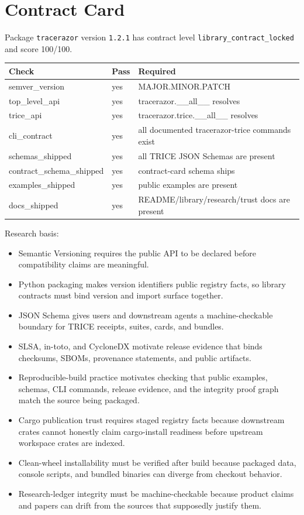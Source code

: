\section{Contract Card}
Package \texttt{tracerazor} version \texttt{1.2.1} has contract level \texttt{library\_contract\_locked} and score 100/100.

\begin{tabular}{lll}
Check & Pass & Required \\
\hline
semver\_version & yes & MAJOR.MINOR.PATCH \\
top\_level\_api & yes & tracerazor.\_\_all\_\_ resolves \\
trice\_api & yes & tracerazor.trice.\_\_all\_\_ resolves \\
cli\_contract & yes & all documented tracerazor-trice commands exist \\
schemas\_shipped & yes & all TRICE JSON Schemas are present \\
contract\_schema\_shipped & yes & contract-card schema ships \\
examples\_shipped & yes & public examples are present \\
docs\_shipped & yes & README/library/research/trust docs are present \\
\end{tabular}

\noindent Research basis:
\begin{itemize}
\item Semantic Versioning requires the public API to be declared before compatibility claims are meaningful.
\item Python packaging makes version identifiers public registry facts, so library contracts must bind version and import surface together.
\item JSON Schema gives users and downstream agents a machine-checkable boundary for TRICE receipts, suites, cards, and bundles.
\item SLSA, in-toto, and CycloneDX motivate release evidence that binds checksums, SBOMs, provenance statements, and public artifacts.
\item Reproducible-build practice motivates checking that public examples, schemas, CLI commands, release evidence, and the integrity proof graph match the source being packaged.
\item Cargo publication trust requires staged registry facts because downstream crates cannot honestly claim cargo-install readiness before upstream workspace crates are indexed.
\item Clean-wheel installability must be verified after build because packaged data, console scripts, and bundled binaries can diverge from checkout behavior.
\item Research-ledger integrity must be machine-checkable because product claims and papers can drift from the sources that supposedly justify them.
\end{itemize}

